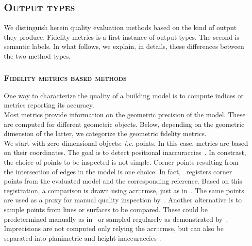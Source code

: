     \subsection{\textsc{Output types}}
        \label{subsec::state_of_the_art::quality::output}
        We distinguish herein quality evaluation methods based on the kind of output they produce.
        Fidelity metrics is a first instance of output types.
        The second is semantic labels.
        In what follows, we explain, in details, these differences between the two method types.

        \subsubsection{\textsc{Fidelity metrics based methods}}
            One way to characterize the quality of a building model is to compute indices or metrics reporting its accuracy.\\

            Most metrics provide information on the geometric precision of the model.
            These are computed for different geometric objects.
            Below, depending on the geometric dimension of the latter, we categorize the geometric fidelity metrics.\\

            We start with zero dimensional objects: \textit{i.e.} points.
            In this case, metrics are based on their coordinates.
            The goal is to detect positional inaccuraccies~\parencite{kaartinen2005accuracy}.
            In constrast, the choice of points to be inspected is not simple.
            Corner points resulting from the intersection of edges in the model is one choice.
            In fact,~\textcite{zeng2014multicriteria} registers corner points from the evaluated model and the corresponding reference.
            Based on this registration, a comparison is drawn using \gls{acr::rmse}, just as in~\parencite{you2011quality,landes2012quality}.
            The same points are used as a proxy for manual quality inspection by~\textcite{elberink2011quality}.
            Another alternative is to sample points from lines or surfaces to be compared.
            These could be predetermined manually as in~\textcite{kaartinen2005accuracy} or sampled regularely as demonstrated by~\textcite{vogtle2003quality,tran2019geometric}.
            Imprecisions are not computed only relying the \gls{acr::rmse}, but can also be separated into planimetric and height inaccuraccies~\parencite{vogtle2003quality,jaynes2003recognition,kaartinen2005accuracy}.\\


